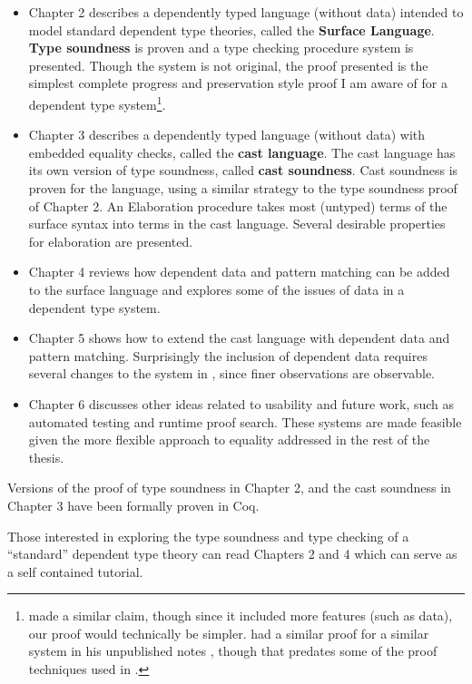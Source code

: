 \begin{itemize}
\item Chapter 2 describes a dependently typed language (without data) intended to model standard dependent type theories, called the \textbf{Surface Language}.
\textbf{Type soundness} is proven and a \bidir{} type checking procedure system is presented.
Though the system is not original, the proof presented is the simplest complete progress and preservation style proof I am aware of for a dependent type system\footnote{
  \cite{sjoberg2015dependently} made a similar claim, though since it included more features (such as data), our proof would technically be simpler.
  \MartinL{} had a similar proof for a similar system in his unpublished notes \cite{Martin-Lof-1971}, though that predates some of the proof techniques used in .
}.
\item Chapter 3 describes a dependently typed language (without data) with embedded equality checks, called the \textbf{cast language}.
The cast language has its own version of type soundness, called \textbf{cast soundness}.
Cast soundness is proven for the language, using a similar strategy to the type soundness proof of Chapter 2.
An Elaboration procedure takes most (untyped) terms of the surface syntax into terms in the cast language.
Several desirable properties for elaboration are presented. %
\item Chapter 4 reviews how dependent data and pattern matching can be added to the surface language and explores some of the issues of data in a dependent type system.
\item Chapter 5 shows how to extend the cast language with dependent data and pattern matching.
Surprisingly the inclusion of dependent data requires several changes to the system in , since finer observations are observable.
\item Chapter 6 discusses other ideas related to usability and future work, such as automated testing and runtime proof search.
These systems are made feasible given the more flexible approach to equality addressed in the rest of the thesis.
\end{itemize}
Versions of the proof of type soundness in Chapter 2, and the cast soundness in Chapter 3 have been formally proven in Coq.

Those interested in exploring the type soundness and type checking of a ``standard'' dependent type theory can read Chapters 2 and 4 which can serve as a self contained tutorial.

